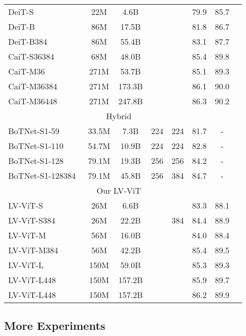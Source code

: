 \documentclass[10pt,twocolumn,letterpaper]{article}
\def \pzo {\phantom{0}}
\def \dzo {\phantom{00}}
\def \OURS {LV-ViT\xspace}
\begin{document}
\begin{table*}
{\begin{tabular}{@{\ }lccccccc}
    \midrule
    DeiT-S~\cite{touvron2020training}             & \pzo22M & \dzo4.6B  &  &   & 79.9  & 85.7  \\
    DeiT-B~\cite{touvron2020training}              & \pzo86M & \pzo17.5B &  &  &  81.8 &   86.7 \\
    DeiT-B384~\cite{touvron2020training}          & \pzo86M & \pzo55.4B &   &   &  83.1 & 87.7 \\
    \midrule
    CaiT-S36384~\cite{touvron2021going}  & \pzo68M & \pzo48.0B &   &   &  85.4 & 89.8 \\
    CaiT-M36~\cite{touvron2021going} & 271M & \pzo53.7B &   &   &  85.1 & 89.3 \\
    CaiT-M36384~\cite{touvron2021going} & 271M & 173.3B &      &  &  86.1 & 90.0 \\
    CaiT-M36448~\cite{touvron2021going} & 271M & 247.8B &  &   & 86.3 & 90.2\\
    \toprule
    
    \multicolumn{7}{c}{Hybrid} \\
    \midrule
    BoTNet-S1-59~\cite{srinivas2021bottleneck} & 33.5M & \dzo7.3B & 224 & 224 & 81.7 & -\\
    BoTNet-S1-110~\cite{srinivas2021bottleneck} & 54.7M & \pzo10.9B & 224 & 224 & 82.8 & - \\
    BoTNet-S1-128~\cite{srinivas2021bottleneck} & 79.1M & \pzo19.3B & 256 & 256 & 84.2 & - \\
    BoTNet-S1-128384~\cite{srinivas2021bottleneck} & 79.1M & \pzo45.8B & 256 & 384 & 84.7 & - \\ \toprule
    \multicolumn{7}{c}{Our LV-ViT} \\
    \midrule
    \OURS-S & \pzo26M & \dzo6.6B &   &    &  83.3 & 88.1 \\
    \OURS-S384 & \pzo26M & \pzo22.2B &   &  384  &  84.4 & 88.9 \\
    \OURS-M & \pzo56M & \pzo16.0B &   &    &  84.0 & 88.4 \\
    \OURS-M384  & \pzo56M & \pzo42.2B &   &   &  85.4 & 89.5 \\
    \OURS-L & 150M & \pzo59.0B &   &   &  85.3 & 89.3 \\
    \OURS-L448 & 150M & 157.2B &   &   &  85.9 & 89.7  \\
    \OURS-L448 & 150M & 157.2B &   &   &  86.2 & 89.9  \\
    \bottomrule
    \end{tabular}}
\end{table*}


\subsection{More Experiments}
\end{document}
